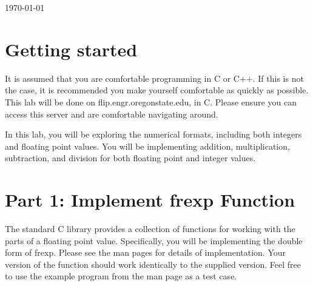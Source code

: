 \documentclass[letterpaper,12pt,titlepage]{article}
\begin{document}
\begin{titlepage}

{\large \today}\\[3cm] %


 

\vfill %

\end{titlepage}


\section*{Getting started}
It is assumed that you are comfortable programming in C or C++. If this is not the case, it is recommended you make yourself comfortable as quickly as possible. This lab will be done on flip.engr.oregonstate.edu, in C. Please ensure you can access this server and are comfortable navigating around.

In this lab, you will be exploring the numerical formats, including both integers and floating point values. You will be implementing addition, multiplication, subtraction, and division for both floating point and integer values.

\section*{Part 1: Implement frexp Function}
The standard C library provides a collection of functions for working with the parts of a floating point value. Specifically, you will be implementing the double form of frexp. Please see the man pages for details of implementation. Your version of the function should work identically to the supplied version. Feel free to use the example program from the man page as a test case.
\end{document}
